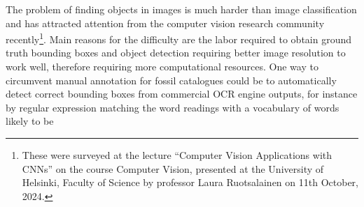 \documentclass[english,twoside,openright]{UH_DS_MSc}
\begin{document}
The problem of finding objects in images is much harder than image classification and has attracted attention 
from the computer vision research community recently\footnote{These were surveyed at the lecture ``Computer Vision Applications with CNNs'' on the course Computer Vision, presented at the University of Helsinki, Faculty of Science by professor Laura Ruotsalainen on 11th October, 2024.}. 
Main reasons for the difficulty are the labor required to obtain ground truth bounding boxes and object detection requiring better image resolution to work well, therefore requiring more computational resources.
One way to circumvent manual annotation for fossil catalogues could be to automatically detect correct bounding boxes 
from commercial OCR engine outputs, for instance by regular expression matching the word readings with a vocabulary of words likely to be 
\end{document}
